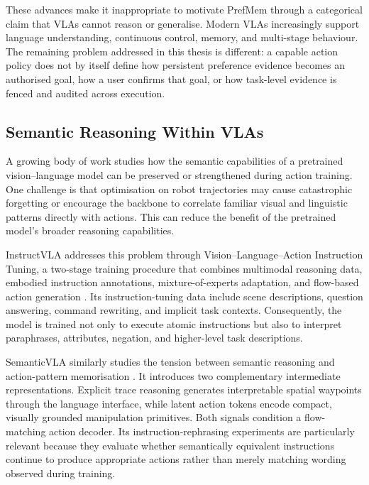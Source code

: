 \documentclass{article}
\begin{document}
These advances make it inappropriate to motivate PrefMem through a categorical
claim that VLAs cannot reason or generalise. Modern VLAs increasingly support
language understanding, continuous control, memory, and multi-stage
behaviour. The remaining problem addressed in this thesis is different: a
capable action policy does not by itself define how persistent preference
evidence becomes an authorised goal, how a user confirms that goal, or how
task-level evidence is fenced and audited across execution.

\subsection{Semantic Reasoning Within VLAs}
\label{subsec:related-semantic-vla}

A growing body of work studies how the semantic capabilities of a pretrained
vision--language model can be preserved or strengthened during action
training. One challenge is that optimisation on robot trajectories may cause
catastrophic forgetting or encourage the backbone to correlate familiar
visual and linguistic patterns directly with actions. This can reduce the
benefit of the pretrained model's broader reasoning capabilities.

InstructVLA addresses this problem through Vision--Language--Action
Instruction Tuning, a two-stage training procedure that combines multimodal
reasoning data, embodied instruction annotations, mixture-of-experts
adaptation, and flow-based action generation
\parencite{yang2025instructvla}. Its instruction-tuning data include scene
descriptions, question answering, command rewriting, and implicit task
contexts. Consequently, the model is trained not only to execute atomic
instructions but also to interpret paraphrases, attributes, negation, and
higher-level task descriptions.

SemanticVLA similarly studies the tension between semantic reasoning and
action-pattern memorisation
\parencite{ni2026semanticvla}. It introduces two complementary intermediate
representations. Explicit trace reasoning generates interpretable spatial
waypoints through the language interface, while latent action tokens encode
compact, visually grounded manipulation primitives. Both signals condition a
flow-matching action decoder. Its instruction-rephrasing experiments are
particularly relevant because they evaluate whether semantically equivalent
instructions continue to produce appropriate actions rather than merely
matching wording observed during training.
\end{document}
